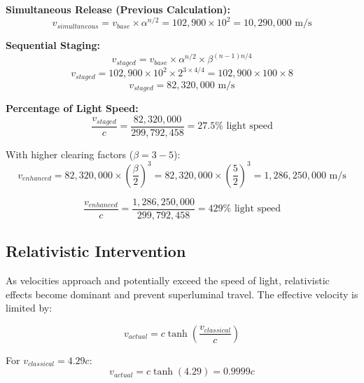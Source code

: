 \documentclass[12pt,a4paper]{article}
\begin{document}
\textbf{Simultaneous Release (Previous Calculation):}
\begin{equation}
v_{simultaneous} = v_{base} \times \alpha^{n/2} = 102,900 \times 10^2 = 10,290,000 \text{ m/s}
\end{equation}

\textbf{Sequential Staging:}
\begin{equation}
v_{staged} = v_{base} \times \alpha^{n/2} \times \beta^{(n-1)n/4}
\end{equation}
\begin{equation}
v_{staged} = 102,900 \times 10^2 \times 2^{3 \times 4/4} = 102,900 \times 100 \times 8
\end{equation}
\begin{equation}
v_{staged} = 82,320,000 \text{ m/s}
\end{equation}

\textbf{Percentage of Light Speed:}
\begin{equation}
\frac{v_{staged}}{c} = \frac{82,320,000}{299,792,458} = 27.5\% \text{ light speed}
\end{equation}

With higher clearing factors ($\beta = 3-5$):
\begin{equation}
v_{enhanced} = 82,320,000 \times \left(\frac{\beta}{2}\right)^3 = 82,320,000 \times \left(\frac{5}{2}\right)^3 = 1,286,250,000 \text{ m/s}
\end{equation}

\begin{equation}
\frac{v_{enhanced}}{c} = \frac{1,286,250,000}{299,792,458} = 429\% \text{ light speed}
\end{equation}

\subsection{Relativistic Intervention}

As velocities approach and potentially exceed the speed of light, relativistic effects become dominant and prevent superluminal travel. The effective velocity is limited by:

\begin{equation}
v_{actual} = c \tanh\left(\frac{v_{classical}}{c}\right)
\end{equation}

For $v_{classical} = 4.29c$:
\begin{equation}
v_{actual} = c \tanh(4.29) = 0.9999c
\end{equation}
\end{document}
